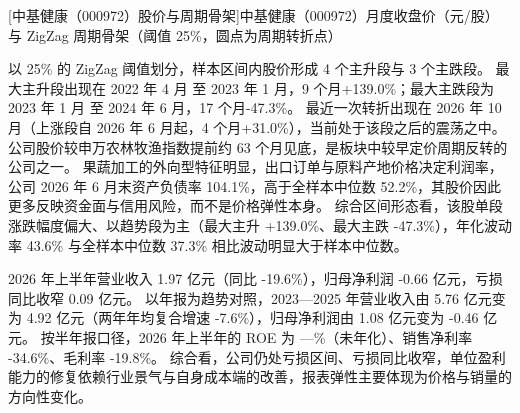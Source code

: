 \begin{center}
\begin{minipage}{\textwidth}\centering
{}

[中基健康（000972）股价与周期骨架]{中基健康（000972）月度收盘价（元/股）与 ZigZag 周期骨架（阈值 25\%，圆点为周期转折点）}
\end{minipage}
\end{center}

 以 25\% 的 ZigZag 阈值划分，样本区间内股价形成 4 个主升段与 3 个主跌段。 最大主升段出现在 2022 年 4 月 至 2023 年 1 月，9 个月+139.0\%；最大主跌段为 2023 年 1 月 至 2024 年 6 月，17 个月-47.3\%。 最近一次转折出现在 2026 年 10 月（上涨段自 2026 年 6 月起，4 个月+31.0\%），当前处于该段之后的震荡之中。 公司股价较申万农林牧渔指数提前约 63 个月见底，是板块中较早定价周期反转的公司之一。 果蔬加工的外向型特征明显，出口订单与原料产地价格决定利润率，公司 2026 年 6 月末资产负债率 104.1\%，高于全样本中位数 52.2\%，其股价因此更多反映资金面与信用风险，而不是价格弹性本身。 综合区间形态看，该股单段涨跌幅度偏大、以趋势段为主（最大主升 +139.0\%、最大主跌 -47.3\%），年化波动率 43.6\% 与全样本中位数 37.3\% 相比波动明显大于样本中位数。

 2026 年上半年营业收入 1.97 亿元（同比 -19.6\%），归母净利润 -0.66 亿元，亏损同比收窄 0.09 亿元。 以年报为趋势对照，2023---2025 年营业收入由 5.76 亿元变为 4.92 亿元（两年年均复合增速 -7.6\%），归母净利润由 1.08 亿元变为 -0.46 亿元。 按半年报口径，2026 年上半年的 ROE 为 —\%（未年化）、销售净利率 -34.6\%、毛利率 -19.8\%。 综合看，公司仍处亏损区间、亏损同比收窄，单位盈利能力的修复依赖行业景气与自身成本端的改善，报表弹性主要体现为价格与销量的方向性变化。

